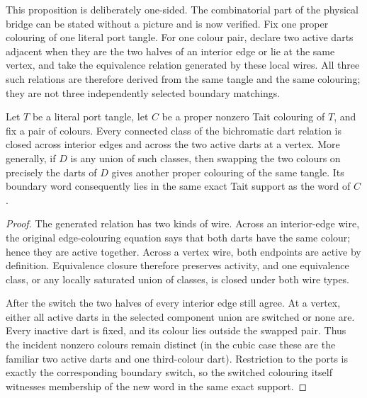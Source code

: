 This proposition is deliberately one-sided.  The combinatorial part of the
physical bridge can be stated without a picture and is now verified.  Fix one
proper colouring of one literal port tangle.  For one colour pair, declare two
active darts adjacent when they are the two halves of an interior edge or lie
at the same vertex, and take the equivalence relation generated by these local
wires.  All three such relations are therefore derived from the same tangle
and the same colouring; they are not three independently selected boundary
matchings.

\begin{theorem}
\label{thm:port-tangle-common-kempe-web}
Let $T$ be a literal port tangle, let $C$ be a proper nonzero Tait colouring of
$T$, and fix a pair of colours.  Every connected class of the bichromatic dart
relation is closed across interior edges and across the two active darts at a
vertex.  More generally, if $D$ is any union of such classes, then swapping the
two colours on precisely the darts of $D$ gives another proper colouring of
the same tangle.  Its boundary word consequently lies in the same exact Tait
support as the word of $C$.
\end{theorem}

\begin{proof}
The generated relation has two kinds of wire.  Across an interior-edge wire,
the original edge-colouring equation says that both darts have the same
colour; hence they are active together.  Across a vertex wire, both endpoints
are active by definition.  Equivalence closure therefore preserves activity,
and one equivalence class, or any locally saturated union of classes, is
closed under both wire types.

After the switch the two halves of every interior edge still agree.  At a
vertex, either all active darts in the selected component union are switched
or none are.  Every inactive dart is fixed, and its colour lies outside the
swapped pair.  Thus the incident nonzero colours remain distinct (in the
cubic case these are the familiar two active darts and one third-colour dart).
Restriction to the ports is exactly the corresponding boundary switch, so
the switched colouring itself witnesses membership of the new word in the
same exact support.
\end{proof}

